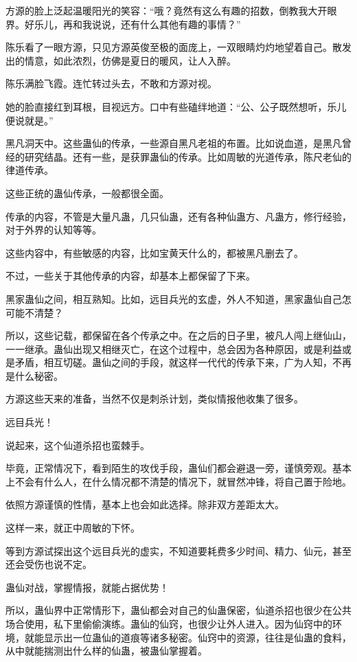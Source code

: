 \begin{this_body}
方源的脸上泛起温暖阳光的笑容：“哦？竟然有这么有趣的招数，倒教我大开眼界。好乐儿，再和我说说，还有什么其他有趣的事情？”

陈乐看了一眼方源，只见方源英俊至极的面庞上，一双眼睛灼灼地望着自己。散发出的情意，如此浓烈，仿佛是夏日的暖风，让人入醉。

陈乐满脸飞霞。连忙转过头去，不敢和方源对视。

她的脸直接红到耳根，目视远方。口中有些磕绊地道：“公、公子既然想听，乐儿便说就是。”

黑凡洞天中。这些蛊仙的传承，一些源自黑凡老祖的布置。比如说血道，是黑凡曾经的研究结晶。还有一些，是获罪蛊仙的传承。比如周敏的光道传承，陈尺老仙的律道传承。

这些正统的蛊仙传承，一般都很全面。

传承的内容，不管是大量凡蛊，几只仙蛊，还有各种仙蛊方、凡蛊方，修行经验，对于外界的认知等等。

这些内容中，有些敏感的内容，比如宝黄天什么的，都被黑凡删去了。

不过，一些关于其他传承的内容，却基本上都保留了下来。

黑家蛊仙之间，相互熟知。比如，远目兵光的玄虚，外人不知道，黑家蛊仙自己怎可能不清楚？

所以，这些记载，都保留在各个传承之中。在之后的日子里，被凡人闯上继仙山，一一继承。蛊仙出现又相继灭亡，在这个过程中，总会因为各种原因，或是利益或是矛盾，相互切磋。蛊仙之间的手段，就这样一代代的传承下来，广为人知，不再是什么秘密。

方源这些天来的准备，当然不仅是刺杀计划，类似情报他收集了很多。

远目兵光！

说起来，这个仙道杀招也蛮棘手。

毕竟，正常情况下，看到陌生的攻伐手段，蛊仙们都会避退一旁，谨慎旁观。基本上不会有什么人，在什么情况都不清楚的情况下，就冒然冲锋，将自己置于险地。

依照方源谨慎的性情，基本上也会如此选择。除非双方差距太大。

这样一来，就正中周敏的下怀。

等到方源试探出这个远目兵光的虚实，不知道要耗费多少时间、精力、仙元，甚至还会受伤也说不定。

蛊仙对战，掌握情报，就能占据优势！

所以，蛊仙界中正常情形下，蛊仙都会对自己的仙蛊保密，仙道杀招也很少在公共场合使用，私下里偷偷演练。蛊仙的仙窍，也很少让外人进入。因为仙窍中的环境，就能显示出一位蛊仙的道痕等诸多秘密。仙窍中的资源，往往是仙蛊的食料，从中就能揣测出什么样的仙蛊，被蛊仙掌握着。


\end{this_body}
